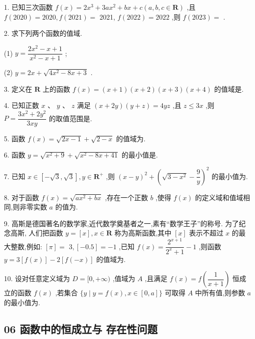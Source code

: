 1. 已知三次函数 $f\left( x\right)  = 2{x}^{3} + {3a}{x}^{2} + {bx} + c\left( {a,b,c \in  \mathbf{R}}\right)$ ,且 $f\left( {2020}\right)  = {2020},f\left( {2021}\right)  =$ 2021, $f\left( {2022}\right)  = {2022}$ ,则 $f\left( {2023}\right)  =$ \blkda{}.

2. 求下列两个函数的值域.

(1) $y = \dfrac{2{x}^{2} - x + 1}{{x}^{2} - x + 1}$ ;

(2) $y = {2x} + \sqrt{4{x}^{2} - {8x} + 3}$ .

3. 定义在 $\mathbf{R}$ 上的函数 $f\left( x\right)  = \left( {x + 1}\right) \left( {x + 2}\right) \left( {x + 3}\right) \left( {x + 4}\right)$ 的值域是\blkda{}.

4. 已知正数 $x\text{ 、 }y\text{ 、 }z$ 满足 $\left( {x + {2y}}\right) \left( {y + z}\right)  = {4yz}$ ,且 $z \leq  {3x}$ ,则 $P = \dfrac{3{x}^{2} + 2{y}^{2}}{3xy}$ 的取值范围是\blkda{}.

5. 函数 $f\left( x\right)  = \sqrt{{2x} - 1} + \sqrt{2 - x}$ 的值域为\blkda{}.

6. 函数 $y = \sqrt{{x}^{2} + 9} + \sqrt{{x}^{2} - {8x} + {41}}$ 的最小值是\blkda{}.

7. 已知 $x \in  \left\lbrack  {-\sqrt{3},\sqrt{3}}\right\rbrack  ,y \in  {\mathbf{R}}^{ + }$ ,则 ${\left( x - y\right) }^{2} + {\left( \sqrt{3 - {x}^{2}} - \dfrac{9}{y}\right) }^{2}$ 的最小值为\blkda{}.

8. 对于函数 $f\left( x\right)  = \sqrt{a{x}^{2} + {bx}}$ ,存在一个正数 $b$ ,使得 $f\left( x\right)$ 的定义域和值域相同,则非零实数 $a$ 的值为\blkda{}.

9. 高斯是德国著名的数学家,近代数学奠基者之一,素有“数学王子”的称号. 为了纪念高斯, 人们把函数 $y = \left\lbrack  x\right\rbrack  ,x \in  \mathbf{R}$ 称为高斯函数,其中 $\left\lbrack  x\right\rbrack$ 表示不超过 $x$ 的最大整数,例如: $\left\lbrack  \pi \right\rbrack   =$  $3,\left\lbrack  {-{0.5}}\right\rbrack   =  - 1$ ,已知 $f\left( x\right)  = \dfrac{{2}^{x + 1}}{{2}^{x} + 1} - 1$ ,则函数 $y = 3\left\lbrack  {f\left( x\right) }\right\rbrack   - 2\left\lbrack  {f\left( {-x}\right) }\right\rbrack$ 的值域为\blkda{}.

10. 设对任意定义域为 $D = \lbrack 0, + \infty )$ ,值域为 $A$ ,且满足 $f\left( x\right)  = f\left( \dfrac{1}{x + 1}\right)$ 恒成立的函数 $f\left( x\right)$ ,若集合 $\{ y \mid  y = f\left( x\right) ,x \in  \left\lbrack  {0,a}\right\rbrack  \}$ 可取得 $A$ 中所有值,则参数 $a$ 的最小值为\blkda{}.

\subsection*{06 函数中的恒成立与 存在性问题}

